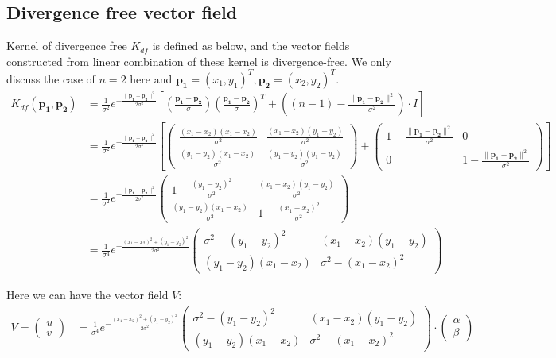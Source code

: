 \documentclass{article}
\theoremstyle{definition}
\theoremstyle{plain}
\begin{document}
\subsection{Divergence free vector field\cite{macedo}}
Kernel of divergence free $K_{df}$ is defined as below, and the vector fields constructed from linear combination of these kernel is divergence-free. We only discuss the case of $n=2$ here and $\mathbf{p_1}=(x_1,y_1)^T, \mathbf{p_2}=(x_2,y_2)^T$.
\begin{align*}
    K_{df}(\mathbf{p_1},\mathbf{p_2})&=\frac{1}{\sigma^2}e^{-\frac{\|\mathbf{p_1}-\mathbf{p_2}\|^2}{2\sigma^2}}\left[\left(\frac{\mathbf{p_1}-\mathbf{p_2}}{\sigma}\right)\left(\frac{\mathbf{p_1}-\mathbf{p_2}}{\sigma}\right)^T+\left((n-1)-\frac{\|\mathbf{p_1}-\mathbf{p_2}\|^2}{\sigma^2}\right)\cdot I\right]\\
    &=\frac{1}{\sigma^2}e^{-\frac{\|\mathbf{p_1}-\mathbf{p_2}\|^2}{2\sigma^2}}
    \left[
    \begin{pmatrix}
    \frac{(x_1-x_2)(x_1-x_2)}{\sigma^2} & \frac{(x_1-x_2)(y_1-y_2)}{\sigma^2}\\
    \frac{(y_1-y_2)(x_1-x_2)}{\sigma^2} & \frac{(y_1-y_2)(y_1-y_2)}{\sigma^2}
    \end{pmatrix}
    +
    \begin{pmatrix}
    1-\frac{\|\mathbf{p_1}-\mathbf{p_2}\|^2}{\sigma^2} & 0\\
    0 & 1-\frac{\|\mathbf{p_1}-\mathbf{p_2}\|^2}{\sigma^2}
    \end{pmatrix}
    \right]\\
    &=\frac{1}{\sigma^2}e^{-\frac{\|\mathbf{p_1}-\mathbf{p_2}\|^2}{2\sigma^2}}
    \begin{pmatrix}
    1-\frac{(y_1-y_2)^2}{\sigma^2} & \frac{(x_1-x_2)(y_1-y_2)}{\sigma^2}\\
    \frac{(y_1-y_2)(x_1-x_2)}{\sigma^2} & 1-\frac{(x_1-x_2)^2}{\sigma^2}
    \end{pmatrix}\\
    &=\frac{1}{\sigma^4}e^{-\frac{(x_1-x_2)^2+(y_1-y_2)^2}{2\sigma^2}}
    \begin{pmatrix}
    \sigma^2-(y_1-y_2)^2 & (x_1-x_2)(y_1-y_2)\\
    (y_1-y_2)(x_1-x_2) & \sigma^2-(x_1-x_2)^2
    \end{pmatrix}
\end{align*}

Here we can have the vector field $V$:
\begin{align}
    V=
    \begin{pmatrix}
        u\\
        v
    \end{pmatrix}
    &=\frac{1}{\sigma^4}e^{-\frac{(x_1-x_2)^2+(y_1-y_2)^2}{2\sigma^2}}
    \begin{pmatrix}
    \sigma^2-(y_1-y_2)^2 & (x_1-x_2)(y_1-y_2)\\
    (y_1-y_2)(x_1-x_2) & \sigma^2-(x_1-x_2)^2
    \end{pmatrix}
    \cdot
    \begin{pmatrix}
    \alpha\\
    \beta
    \end{pmatrix}
    \label{divfree}
\end{align}
\end{document}
